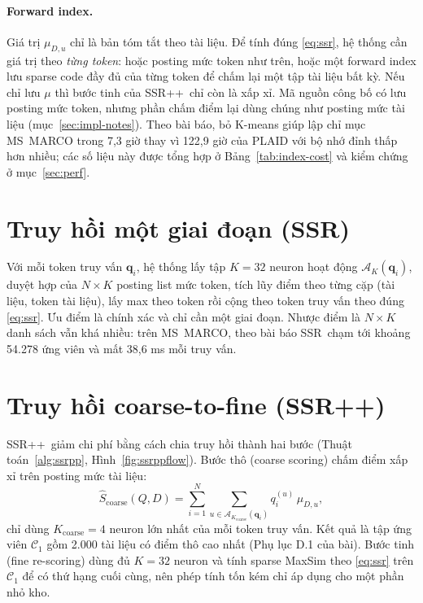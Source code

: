 \documentclass[a4paper,13pt]{extreport}
\theoremstyle{plain}
\newcommand{\ssr}{SSR}
\newcommand{\ssrpp}{SSR++}
\newcommand{\bq}{\mathbf{q}}
\newcommand{\AK}{\mathcal{A}_K}
\begin{document}
\paragraph{Forward index.} Giá trị $\mu_{D,u}$ chỉ là bản tóm tắt theo tài liệu. Để tính đúng \eqref{eq:ssr}, hệ thống cần giá trị theo \emph{từng token}: hoặc posting mức token như trên, hoặc một forward index lưu sparse code đầy đủ của từng token để chấm lại một tập tài liệu bất kỳ. Nếu chỉ lưu $\mu$ thì bước tinh của \ssrpp\ chỉ còn là xấp xỉ. Mã nguồn công bố có lưu posting mức token, nhưng phần chấm điểm lại dùng chúng như posting mức tài liệu (mục~\ref{sec:impl-notes}). Theo bài báo, bỏ K-means giúp lập chỉ mục MS~MARCO trong 7,3 giờ thay vì 122,9 giờ của PLAID với bộ nhớ đỉnh thấp hơn nhiều; các số liệu này được tổng hợp ở Bảng~\ref{tab:index-cost} và kiểm chứng ở mục~\ref{sec:perf}.

\section{Truy hồi một giai đoạn (\ssr)}
\label{sec:ssr-exact}
Với mỗi token truy vấn $\bq_i$, hệ thống lấy tập $K=32$ neuron hoạt động $\AK(\bq_i)$, duyệt hợp của $N\times K$ posting list mức token, tích lũy điểm theo từng cặp (tài liệu, token tài liệu), lấy max theo token rồi cộng theo token truy vấn theo đúng \eqref{eq:ssr}. Ưu điểm là chính xác và chỉ cần một giai đoạn. Nhược điểm là $N\times K$ danh sách vẫn khá nhiều: trên MS~MARCO, theo bài báo \ssr\ chạm tới khoảng 54.278 ứng viên và mất 38,6 ms mỗi truy vấn.

\section{Truy hồi coarse-to-fine (\ssrpp)}
\label{sec:ssrpp}
\ssrpp\ giảm chi phí bằng cách chia truy hồi thành hai bước (Thuật toán~\ref{alg:ssrpp}, Hình~\ref{fig:ssrppflow}). Bước thô (coarse scoring) chấm điểm xấp xỉ trên posting mức tài liệu:
\begin{equation}
\hat S_{\mathrm{coarse}}(Q,D)=\sum_{i=1}^{N}\sum_{u\in\mathcal{A}_{K_{\mathrm{coarse}}}(\bq_i)} q_i^{(u)}\,\mu_{D,u} ,
\label{eq:coarse}
\end{equation}
chỉ dùng $K_{\mathrm{coarse}}=4$ neuron lớn nhất của mỗi token truy vấn. Kết quả là tập ứng viên $\mathcal{C}_1$ gồm 2.000 tài liệu có điểm thô cao nhất (Phụ lục D.1 của bài). Bước tinh (fine re-scoring) dùng đủ $K=32$ neuron và tính sparse MaxSim theo \eqref{eq:ssr} trên $\mathcal{C}_1$ để có thứ hạng cuối cùng, nên phép tính tốn kém chỉ áp dụng cho một phần nhỏ kho.
\end{document}
